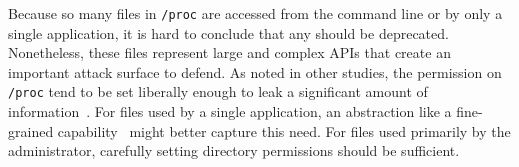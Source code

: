 Because so many files in {\tt /proc} are accessed from the command line
or by only a single application, it is hard to conclude that any should be deprecated.
Nonetheless, these files represent large and complex APIs that create an important attack surface to defend.
As noted in other studies, the permission on {\tt /proc} tend to be
set liberally enough to leak a  significant amount of information~\cite{memento}.
For files used by a single application, an abstraction like a fine-grained capability~\cite{shapiro99eros}
might better capture this need.  
For files used primarily by the administrator,
carefully setting directory permissions should be sufficient.







